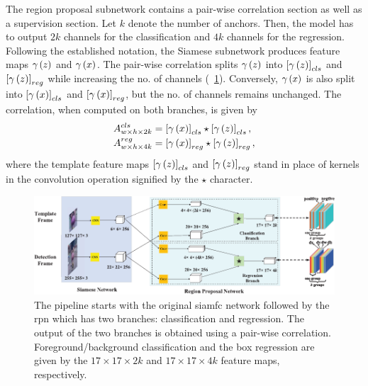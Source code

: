 The region proposal subnetwork contains a pair-wise correlation section as well as a supervision section. Let $k$ denote the number of anchors. Then, the model has to output $2k$ channels for the classification and $4k$ channels for the regression. Following the established notation, the Siamese subnetwork produces feature maps ${\gamma} \left( z \right)$ and ${\gamma} \left( x \right)$. The pair-wise correlation splits ${\gamma} \left( z \right)$ into $\left[ {{\gamma} \left( z \right)} \right]_{cls}$ and $\left[ {{\gamma} \left( z \right)} \right]_{reg}$ while increasing the no. of channels (\figtext{}~\ref{fig:SiamRPNNetArchitecture}). Conversely, ${\gamma} \left( x \right)$ is also split into $\left[ {{\gamma} \left( x \right)} \right]_{cls}$ and $\left[ {{\gamma} \left( x \right)} \right]_{reg}$, but the no. of channels remains unchanged. The correlation, when computed on both branches, is given by
\begin{equation}
    \begin{aligned}
        {A}_{w \times h \times 2k}^{cls} & =
        \left[ {{\gamma} \left( x \right)} \right]_{cls} \star \left[ {{\gamma} \left( z \right)} \right]_{cls}, \\
        {A}_{w \times h \times 4k}^{reg} & =
        \left[ {{\gamma} \left( x \right)} \right]_{reg} \star \left[ {{\gamma} \left( z \right)} \right]_{reg},
    \end{aligned}
\end{equation}
where the template feature maps $\left[ {{\gamma} \left( z \right)} \right]_{cls}$ and $\left[ {{\gamma} \left( z \right)} \right]_{reg}$ stand in place of kernels in the convolution operation signified by the $\star$ character.

\begin{figure}[t]
    \centerline{\includegraphics[width=\linewidth]{figures/theoretical_foundations/siam_rpn_architecture.pdf}}
    \caption[\gls{siamrpn} architecture]{The pipeline starts with the original \gls{siamfc} network followed by the \gls{rpn} which has two branches: classification and regression. The output of the two branches is obtained using a pair-wise correlation. Foreground/background classification and the box regression are given by the $17 \times 17 \times 2k$ and $17 \times 17 \times 4k$ feature maps, respectively. }
    \label{fig:SiamRPNNetArchitecture}
\end{figure}

